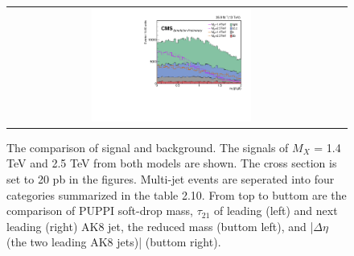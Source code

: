 \begin{figure}[t]
\begin{tabular}{cc}
    \includegraphics[width=0.5\textwidth]{Figures/MC_N1/deltaEta.pdf} \\
  \end{tabular}
  \caption{The comparison of signal and background. The signals of $M_{X}$ = 1.4 TeV and 2.5 TeV from both models are shown. The cross section is set to 20 pb in the figures. Multi-jet events are seperated into four categories summarized in the table 2.10. From top to buttom are the comparison of PUPPI soft-drop mass, $\tau _{21}$ of leading (left) and next leading (right) AK8 jet, the reduced mass (buttom left), and |$\Delta \eta $ (the two leading AK8 jets)| (buttom right).}
  \label{fig:hvt_brs}
\end{figure}

